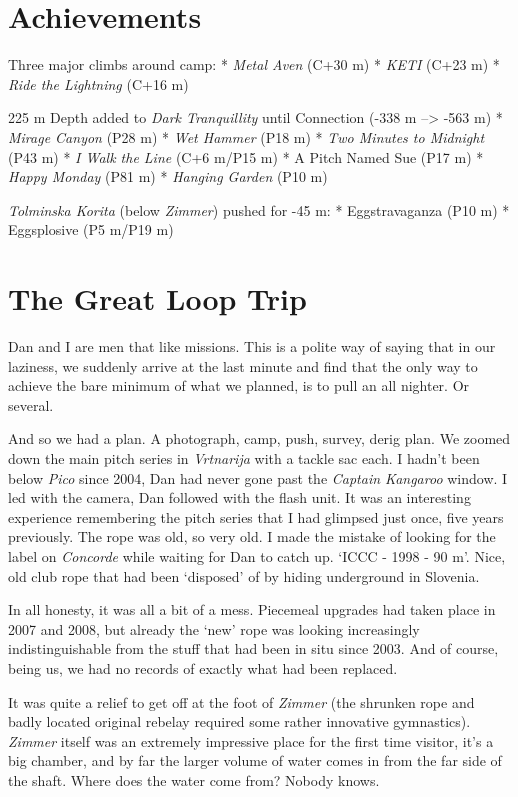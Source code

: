 \hypertarget{achievements}{%
\section{Achievements}\label{achievements}}

Three major climbs around camp: * \emph{Metal Aven} (C+30 m) *
\emph{KETI} (C+23 m) * \emph{Ride the Lightning} (C+16 m)

225 m Depth added to \emph{Dark Tranquillity} until Connection (-338 m
--\textgreater{} -563 m) * \emph{Mirage Canyon} (P28 m) * \emph{Wet
Hammer} (P18 m) * \emph{Two Minutes to Midnight} (P43 m) * \emph{I Walk
the Line} (C+6 m/P15 m) * A Pitch Named Sue (P17 m) * \emph{Happy
Monday} (P81 m) * \emph{Hanging Garden} (P10 m)

\emph{Tolminska Korita} (below \emph{Zimmer}) pushed for -45 m: *
Eggstravaganza (P10 m) * Eggsplosive (P5 m/P19 m)

\hypertarget{the-great-loop-trip}{%
\section{The Great Loop Trip}\label{the-great-loop-trip}}

Dan and I are men that like missions. This is a polite way of saying
that in our laziness, we suddenly arrive at the last minute and find
that the only way to achieve the bare minimum of what we planned, is to
pull an all nighter. Or several.

And so we had a plan. A photograph, camp, push, survey, derig plan. We
zoomed down the main pitch series in \emph{Vrtnarija} with a tackle sac
each. I hadn't been below \emph{Pico} since 2004, Dan had never gone
past the \emph{Captain Kangaroo} window. I led with the camera, Dan
followed with the flash unit. It was an interesting experience
remembering the pitch series that I had glimpsed just once, five years
previously. The rope was old, so very old. I made the mistake of looking
for the label on \emph{Concorde} while waiting for Dan to catch up.
`ICCC - 1998 - 90 m'. Nice, old club rope that had been `disposed' of by
hiding underground in Slovenia.

In all honesty, it was all a bit of a mess. Piecemeal upgrades had taken
place in 2007 and 2008, but already the `new' rope was looking
increasingly indistinguishable from the stuff that had been in situ
since 2003. And of course, being us, we had no records of exactly what
had been replaced.

It was quite a relief to get off at the foot of \emph{Zimmer} (the
shrunken rope and badly located original rebelay required some rather
innovative gymnastics). \emph{Zimmer} itself was an extremely impressive
place for the first time visitor, it's a big chamber, and by far the
larger volume of water comes in from the far side of the shaft. Where
does the water come from? Nobody knows.

